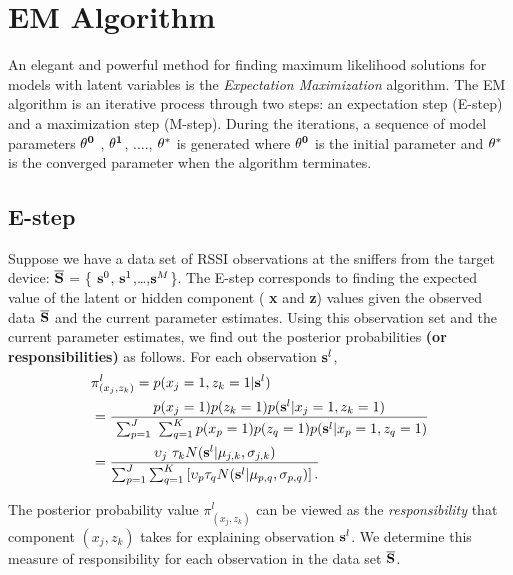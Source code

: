 \section{EM Algorithm}
\label{sec:emalgorithm}

An elegant and powerful method for finding maximum likelihood solutions
for models with latent variables is the \emph{Expectation Maximization} 
	algorithm. The EM algorithm is an iterative process through two
	steps: an expectation step (E-step) and a maximization step (M-step). During the iterations, a sequence of model parameters ${\bf \theta^{0}}$
, ${\bf \theta^{1}}$, ...., ${\bf \theta^{*}}$ is generated where ${\bf \theta^{0}}$ is the initial parameter and ${\bf \theta^{*}}$ is the converged parameter when the algorithm terminates.

\subsection{E-step}
\label{subsec:estep}

Suppose we have a data set of RSSI observations at
the sniffers from the target device: ${\bf \overline{S}}$ = \{
${\bf {s}}^{0}$, ${\bf {s}}^{1}$,\ldots,${\bf {s}}^{M}$\}. The E-step
corresponds to finding the expected value of the latent or hidden component ({\bf
		x} and {\bf z}) values given the observed data  ${\bf \overline{S}}$ and the current parameter estimates.
Using this observation set and the current parameter estimates, we find out the posterior probabilities \textbf{(or responsibilities)} as follows. 
For each observation ${\bf {s}}^{l}$,
\begin{align}
& \pi_{({x_{j}}, {z_{k}})}^{l}  = p({x_{j}} = 1, {z_{k}} = 1 | {\bf{s}}^{l}) \\ 
& = \frac { p({x_{j}} = 1)p({z_{k}} = 1)p( {\bf {s}}^{l} | {x_{j}} = 1, {z_{k}} = 1)} {\ \sum_{p=1}^J \ \sum_{q=1}^{K} p({x_{p}} = 1) p({z_{q}} = 1) p( {\bf {s}}^{l} | {x_{p}} = 1, {z_{q}} = 1)} \nonumber \\ 
& = \frac { \upsilon_{j} \ \tau_{k} N({\bf {s}}^{l} | {\bf {\mu}}_{j,k}, {\bf {\sigma}}_{j,k})} {\sum_{p=1}^J \sum_{q=1}^K \left[\upsilon_{p} \tau_{q} N({\bf {s}}^{l} | {\bf {\mu}}_{p,q}, {\bf {\sigma}}_{p,q})\right]. } 
\end{align}

\noindent The posterior probability value $\pi_{({x_{j}}, {z_{k}})}^{l}$ can be viewed as the {\it responsibility} that component $({x_{j}}, {z_{k}})$ takes for explaining observation ${\bf {s}}^{l}$. We determine this measure of responsibility for each observation in the data set ${\bf \overline{S}}$.


